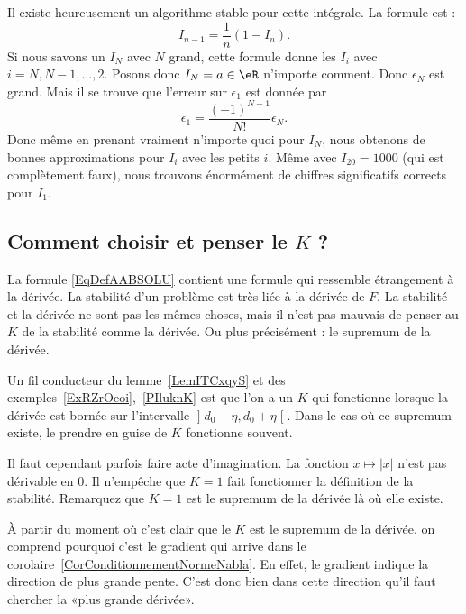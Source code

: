Il existe heureusement un algorithme stable pour cette intégrale. La formule est :
\begin{equation}
	I_{n-1}=\frac{1}{ n }(1-I_n).
\end{equation}
Si nous savons un \( I_N\) avec \( N\) grand, cette formule donne les \( I_i\) avec \( i=N,N-1,\ldots, 2\). Posons donc \( I_N=a\in \eR\) n'importe comment. Donc \( \epsilon_N\) est grand. Mais il se trouve que l'erreur sur \( \epsilon_1\) est donnée par
\begin{equation}
	\epsilon_1=\frac{ (-1)^{N-1} }{ N! }\epsilon_N.
\end{equation}
Donc même en prenant vraiment n'importe quoi pour \( I_N\), nous obtenons de bonnes approximations pour \( I_i\) avec les petits \( i\). Même avec \( I_{20}=1000\) (qui est complètement faux), nous trouvons énormément de chiffres significatifs corrects pour \( I_1\).

\subsection{Comment choisir et penser le \texorpdfstring{\(  K\)}{K} ?}

La formule \eqref{EqDefAABSOLU} contient une formule qui ressemble étrangement à la dérivée. La stabilité d'un problème est très liée à la dérivée de \( F\). La stabilité et la dérivée ne sont pas les mêmes choses, mais il n'est pas mauvais de penser au \( K\) de la stabilité comme la dérivée. Ou plus précisément : le supremum de la dérivée.

Un fil conducteur du lemme~\ref{LemITCxqyS} et des exemples~\ref{ExRZrOeoi},~\ref{PIluknK} est que l'on a un \( K\) qui fonctionne lorsque la dérivée est bornée sur l'intervalle \( \mathopen] d_0-\eta , d_0+\eta \mathclose[\). Dans le cas où ce supremum existe, le prendre en guise de \( K\) fonctionne souvent.

Il faut cependant parfois faire acte d'imagination. La fonction \( x\mapsto| x |\) n'est pas dérivable en \( 0\). Il n'empêche que \( K=1\) fait fonctionner la définition de la stabilité. Remarquez que \( K=1\) est le supremum de la dérivée là où elle existe.

À partir du moment où c'est clair que le \( K\) est le supremum de la dérivée, on comprend pourquoi c'est le gradient qui arrive dans le corolaire~\ref{CorConditionnementNormeNabla}. En effet, le gradient indique la direction de plus grande pente. C'est donc bien dans cette direction qu'il faut chercher la «plus grande dérivée».

